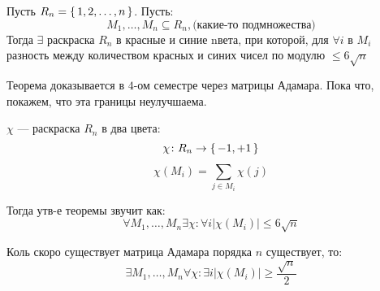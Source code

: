 \begin{theorem}
\label{theorem:03_2}
  Пусть $R_n = \set{1, 2, \ldots, n}$. Пусть:
  \[
    M_1, \ldots, M_n \subseteq R_n, \text{(какие-то подмножества)}
  \]
  Тогда $\exists$ раскраска $R_n$ в красные и синие nвета, при которой, для $\forall i$ в $M_i$ разность между количеством красных и синих чисел по модулю $\leq 6 \sqrt{n}$
\end{theorem}
Теорема доказывается в $4$-ом семестре через матрицы Адамара. Пока что, покажем, что эта границы неулучшаема.
\begin{symb}
$\chi$ --- раскраска $R_n$ в два цвета:
\[
  \chi \colon R_n \rightarrow \set{-1, +1}
\]
\[
  \chi(M_i) = \sum_{j \in M_i}^{}\chi(j)
\]
\end{symb}
Тогда утв-е теоремы звучит как:
\[
\forall M_1, \ldots, M_n \exists \chi \colon \forall i \left|\chi(M_i)\right| \leq 6\sqrt{n}
\]
\begin{theorem}
\label{theorem:03_3}
  Коль скоро существует матрица Адамара порядка $n$ существует, то:
  \[
  \exists M_1, \ldots, M_n \forall \chi \colon \exists i \left|\chi(M_i)\right| \geq \frac{\sqrt{n}}{2}
  \]
\end{theorem}
